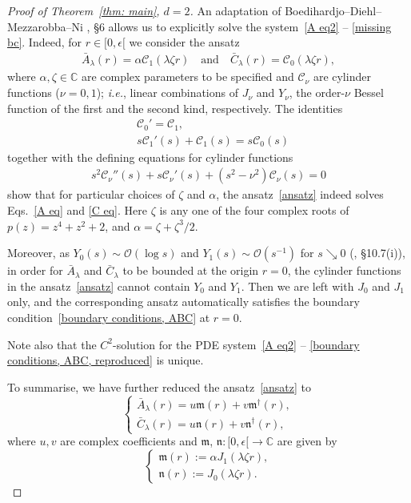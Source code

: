 \documentclass[11pt,a4paper,english,reqno]{amsart}
\theoremstyle{plain}
\newcommand{\C}{\mathbb{C}}
\newcommand{\e}{\epsilon}
\newcommand{\1}{\mathbbm{1}}
\newcommand{\mm}{{\mathfrak{m}}}
\newcommand{\nn}{{\mathfrak{n}}}
\begin{document}
\begin{proof}[Proof of Theorem~\ref{thm: main}, $d=2$]
An adaptation of Boedihardjo--Diehl--Mezzarobba--Ni \cite{boedihardjo2021expected}, \S 6 allows us to explicitly solve the system~\eqref{A eq2} -- \eqref{missing bc}. Indeed, for $r \in [0,\e[$ we  consider the ansatz
\begin{align}\label{ansatz}
\bar{A}_\lambda(r) =\alpha  \mathscr{C}_1(\lambda\zeta r)\quad \text{and}\quad \bar{C}_\lambda(r) = \mathscr{C}_0(\lambda\zeta r),
\end{align}
where $\alpha,\zeta \in \C$ are complex parameters to be specified and $\mathscr{C}_\nu$ are cylinder functions ($\nu=0,1$); \emph{i.e.}, linear combinations of $J_\nu$ and $Y_\nu$, the order-$\nu$ Bessel function of the first and the second kind, respectively. The identities
\begin{align*}
&\mathscr{C}_0'=\mathscr{C}_1,\\
&s\mathscr{C}_1'(s) + \mathscr{C}_1(s) = s\mathscr{C}_0(s)
\end{align*} 
together with the defining equations for cylinder functions
\begin{align}\label{std bessel ODE}
s^2\mathscr{C}_\nu''(s)+s\mathscr{C}_\nu'(s)+(s^2-\nu^2)\mathscr{C}_\nu(s)=0
\end{align}
show that for particular choices of $\zeta$ and $\alpha$, the ansatz~\eqref{ansatz} indeed solves Eqs.~\eqref{A eq} and \eqref{C eq}. Here $\zeta$ is any one of the four complex roots of $p(z)=z^4+z^2+2$, and $\alpha=\zeta+\zeta^3/2.$


Moreover, as $Y_0(s)\sim \mathcal{O}(\log s)$ and $Y_1(s)\sim \mathcal{O}(s^{-1})$ for $s \searrow 0$ (\cite{lozier2003nist}, \S 10.7(i)), in order for $\bar{A}_\lambda$ and $\bar{C}_\lambda$ to be bounded at the origin $r=0$, the cylinder functions in the ansatz~\eqref{ansatz} cannot contain $Y_0$ and $Y_1$. Then we are left with $J_0$ and $J_1$ only, and the corresponding ansatz automatically satisfies the boundary condition~\eqref{boundary conditions, ABC} at $r=0$. 


Note also that the $C^2$-solution for the PDE system~\eqref{A eq2} -- \eqref{boundary conditions, ABC, reproduced} is unique.


To summarise, we have further reduced the ansatz~\eqref{ansatz} to
\begin{equation}\label{ansatz'}
\begin{cases}
\bar{A}_\lambda(r) = u\mm(r) + v \mm^\dagger(r),\\
\bar{C}_\lambda(r) = u\nn(r) + v\nn^\dagger(r), 
\end{cases}
\end{equation}
where $u,v$ are complex coefficients and $\mm$, $\nn: [0,\e[ \to \C$ are given by
\begin{equation}\label{m,n}
\begin{cases}
\mm(r):=\alpha J_1(\lambda\zeta r),\\
\nn(r):=J_0(\lambda\zeta r).
\end{cases}
\end{equation}



\end{proof}
\end{document}
